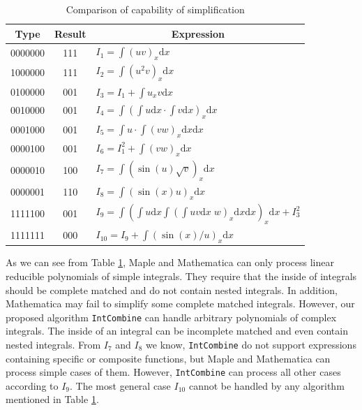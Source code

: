 \begin{table}[htb]
\renewcommand{\arraystretch}{1.25}
\centering
\caption{Comparison of capability of simplification} \label{tb1}
\renewcommand{\dd}[1]{\mathrm{d}#1}
\renewcommand{\ii}[1]{\int\!{#1\dd x}}
\begin{tabular}{ccl}
\hline
Type & Result & \multicolumn{1}{c}{Expression} \\
\hline
0000000 & 111 & $I_1=\int\!{(uv)_x\dd x}$\\ 
1000000 & 111 & $I_2=\int\!{(u^2v)_x\dd x}$\\ 
0100000 & 001 & $I_3=I_1+\int\!{u_xv\dd x}$\\ 
0010000 & 001 & $I_4=\int\!{(\int\!{u\dd x}\cdot \int\!{v\dd x})_x\dd x}$\\
0001000 & 001 & $I_5=\int\!{u\cdot \int\!{(vw)_x\dd x}\dd x}$\\
0000100 & 001 & $I_6=I_1^2+\int\!{(vw)_x\dd x}$\\
0000010 & 100 & $I_7=\int\!{(\sin(u)\sqrt{v})_x\dd x}$\\
0000001 & 110 & $I_8=\int\!{(\sin(x)u)_x\dd x}$\\
1111100 & 001 & $I_9=\int\!{(\int\!{u\dd x}\int\!{(\int\!{uv\dd x}\;w)_x\dd x\dd x})_x\dd x}+I_3^2$\\
1111111 & 000 & $I_{10}=I_9+\int\!{(\sin(x)/u)_x\dd x}$\\
\hline
\end{tabular}
\end{table} 

As we can see from Table \ref{tb1}, Maple and Mathematica can only process linear reducible polynomials of simple integrals. They require that the inside of integrals should be complete matched and do not contain nested integrals. In addition, Mathematica may fail to simplify some complete matched integrals. However, our proposed algorithm \texttt{IntCombine} can handle arbitrary polynomials of complex integrals. The inside of an integral can be incomplete matched and even contain nested integrals. From $I_7$ and $I_8$ we know, \texttt{IntCombine} do not support expressions containing specific or composite functions, but Maple and Mathematica can process simple cases of them. However,  \texttt{IntCombine} can process all other cases according to $I_9$. The most general case $I_{10}$ cannot be handled by any algorithm mentioned in Table \ref{tb1}. 

